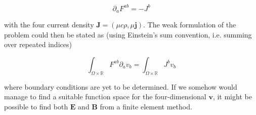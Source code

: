 \documentclass[11pt, a4paper]{article}
\begin{document}
\begin{equation}
    \partial_a F^{ab} = - J^b
\end{equation}

with the four current density $\mathbf{J} = (\mu c \rho, \mu \mathbf{j})$. The 
weak formulation of the problem could then be stated as (using Einstein's sum
convention, i.e. summing over repeated indices)

\begin{equation}
    \int_{\Omega \times \mathbb{R}} F^{ab} \partial_a v_b = \int_{\Omega \times \mathbb{R}} J^b v_b
\end{equation}

where boundary conditions are yet to be determined. If we somehow would manage
to find a suitable function space for the four-dimensional $\mathbf{v}$, it might 
be possible to find both $\mathbf{E}$ and $\mathbf{B}$ from a finite element method.


\end{document}
